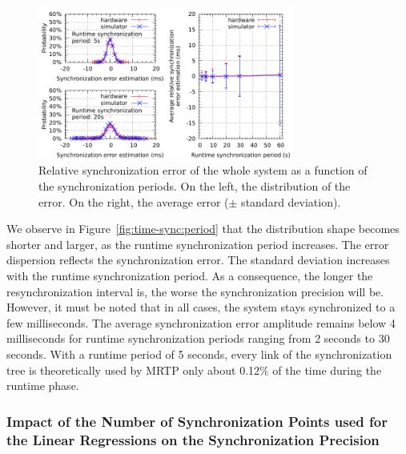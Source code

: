 \begin{figure}[!h]
	\begin{center}
		\includegraphics[width=0.75\textwidth,valign=c]{images/time-synchronization/period.pdf}
	\end{center}
	\caption{Relative synchronization error of the whole system as a function of the synchronization periods. On the left, the distribution of the error. On the right, the average error ($\pm$ standard deviation).}
	\label{fig:time-sync:period}
	\label{fig:time-sync:synchronization-error}
\end{figure}

We observe in Figure~\ref{fig:time-sync:period} that the distribution shape becomes shorter and larger, as the runtime synchronization period increases. The error dispersion reflects the synchronization error. The standard deviation increases with the runtime synchronization period. As a consequence, the longer the resynchronization interval is, the worse the synchronization precision will be. However, it must be noted that in all cases, the system stays synchronized to a few milliseconds. The average synchronization error amplitude remains below 4 milliseconds for runtime synchronization periods ranging from 2 seconds to 30 seconds. With a runtime period of 5 seconds, every link of the synchronization tree is theoretically used by MRTP only about 0.12\% of the time during the runtime phase.

\subsubsection{Impact of the Number of Synchronization Points used for the Linear Regressions on the Synchronization Precision}
\label{section:time-sync:eval-window}

